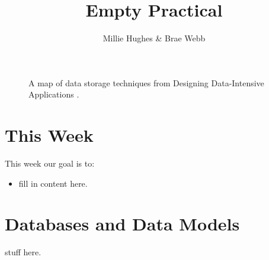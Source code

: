 \documentclass{csse4400}
\title{Empty Practical}
\author{Millie Hughes \& Brae Webb}
\date{\week{0}}
\begin{document}
\maketitle

\begin{figure}[h]
  \href{https://www.oreilly.com/library/view/designing-data-intensive-applications/9781491903063/ch02.html}{
  }
\caption{A map of data storage techniques from Designing Data-Intensive Applications \cite{data-intensive}.}
\end{figure}


\section{This Week}
This week our goal is to:
\begin{itemize}
  \item fill in content here.
\end{itemize}

\section{Databases and Data Models}
stuff here.





\end{document}

